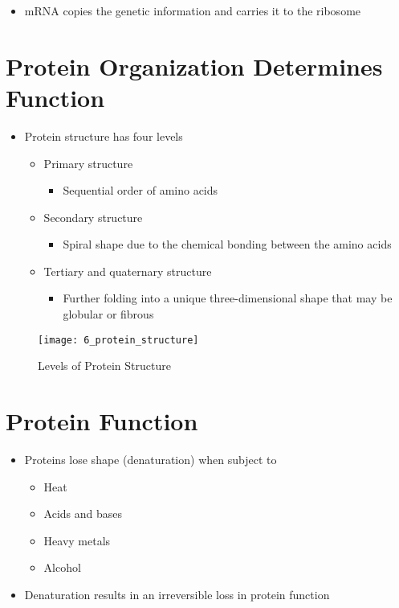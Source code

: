 \documentclass[title={Chapter 6}]{fdsn201notes}
\begin{document}
\begin{itemize}
	\item mRNA copies the genetic information and carries it to the ribosome
\end{itemize}

\section{Protein Organization Determines Function}\label{sec:protein-organization-determines-function}
\begin{itemize}
	\item Protein structure has four levels
	\begin{itemize}
		\item Primary structure
		\begin{itemize}
			\item Sequential order of amino acids
		\end{itemize}
		\item Secondary structure
		\begin{itemize}
			\item Spiral shape due to the chemical bonding between the amino acids
		\end{itemize}
		\item Tertiary and quaternary structure
		\begin{itemize}
			\item Further folding into a unique three-dimensional shape that may be globular or fibrous
		\end{itemize}
	\end{itemize}
\end{itemize}

\begin{figure}[H]
	\centering
	\texttt{[image: 6\_protein\_structure]}
	\caption{Levels of Protein Structure}
	\label{fig:protein-structure-leves}
\end{figure}

\section{Protein Function}\label{sec:protein-function}
\begin{itemize}
	\item Proteins lose shape (denaturation) when subject to
	\begin{itemize}
		\item Heat
		\item Acids and bases
		\item Heavy metals
		\item Alcohol
	\end{itemize}
	\item Denaturation results in an irreversible loss in protein function
\end{itemize}
\end{document}
